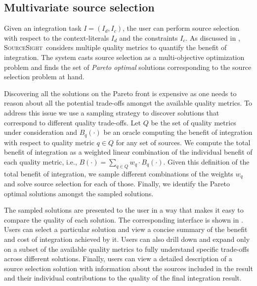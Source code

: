 \documentclass{sig-alternate-05-2015}
\newcommand\system{\textsc{SourceSight}}
\begin{document}
\subsection{Multivariate source selection}
\label{sec:sourcesel}
Given an integration task $I = (I_d,I_c)$, the user can perform source selection with respect to the context-literals $I_d$ and the constraints $I_c$. As discussed in , \system~considers multiple quality metrics to quantify the benefit of integration. The system casts source selection as a multi-objective optimization problem and finds the set of {\em Pareto optimal} solutions corresponding to the source selection problem at hand. 

Discovering all the solutions on the Pareto front is expensive as one needs to reason about all the potential trade-offs amongst the available quality metrics. To address this issue we use a sampling strategy to discover solutions that correspond to different quality trade-offs. Let $Q$ be the set of quality metrics under consideration and $B_q(\cdot)$ be an oracle computing the benefit of integration with respect to quality metric $q \in Q$ for any set of sources. We compute the total benefit of integration as a weighted linear combination of the individual benefit of each quality metric, i.e., $B(\cdot) = \sum_{q \in Q} w_q \cdot B_q(\cdot)$. Given this definition of the total benefit of integration, we sample different combinations of the weights $w_q$ and solve source selection for each of those. Finally, we identify the Pareto optimal solutions amongst the sampled solutions. 

The sampled solutions are presented to the user in a way that makes it easy to compare the quality of each solution. The corresponding interface is shown in . Users can select a particular solution and view a concise summary of the benefit and cost of integration achieved by it. Users can also drill down and expand only on a subset of the available quality metrics to fully understand specific trade-offs across different solutions. Finally, users can view a detailed description of a source selection solution with information about the sources included in the result and their individual contributions to the quality of the final integration result. 
\end{document}
